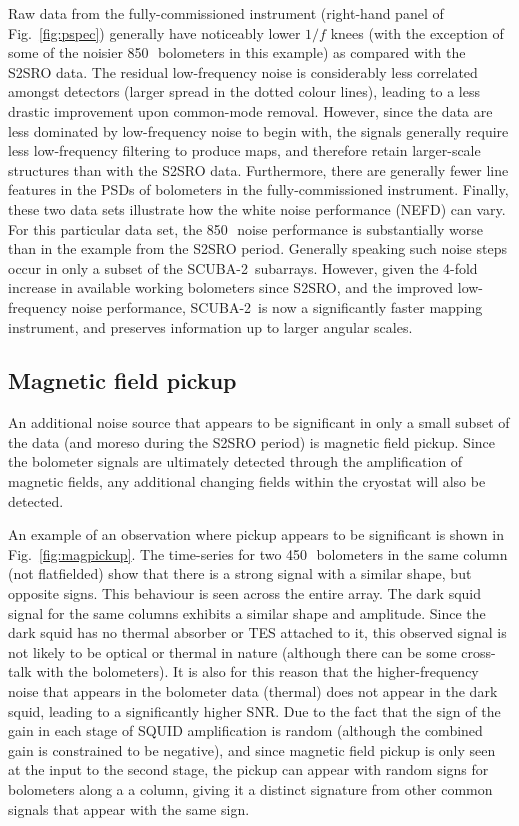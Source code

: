 \documentclass[useAMS,usenatbib,nofootinbib]{mn2e}
\newcommand{\snr}{SNR}
\newcommand{\scuba}{SCUBA-2}
\begin{document}
Raw data from the fully-commissioned instrument (right-hand panel of
Fig.~\ref{fig:pspec}) generally have noticeably lower $1/f$ knees
(with the exception of some of the noisier 850\,\micron\ bolometers in
this example) as compared with the S2SRO data. The residual
low-frequency noise is considerably less correlated amongst detectors
(larger spread in the dotted colour lines), leading to a less drastic
improvement upon common-mode removal. However, since the data are less
dominated by low-frequency noise to begin with, the signals generally
require less low-frequency filtering to produce maps, and therefore
retain larger-scale structures than with the S2SRO data. Furthermore,
there are generally fewer line features in the PSDs of bolometers in
the fully-commissioned instrument. Finally, these two data sets
illustrate how the white noise performance (NEFD) can vary. For this
particular data set, the 850\,\micron\ noise performance is
substantially worse than in the example from the S2SRO
period. Generally speaking such noise steps occur in only a subset of
the \scuba\ subarrays. However, given the 4-fold increase in available
working bolometers since S2SRO, and the improved low-frequency noise
performance, \scuba\ is now a significantly faster mapping instrument,
and preserves information up to larger angular scales.

\subsection{Magnetic field pickup}
\label{sec:magpickup}

An additional noise source that appears to be significant in only a
small subset of the data (and moreso during the S2SRO period) is
magnetic field pickup. Since the bolometer signals are ultimately
detected through the amplification of magnetic fields, any additional
changing fields within the cryostat will also be detected.

An example of an observation where pickup appears to be significant is
shown in Fig.~\ref{fig:magpickup}. The time-series for two
450\,\micron\ bolometers in the same column (not flatfielded) show
that there is a strong signal with a similar shape, but opposite
signs. This behaviour is seen across the entire array. The dark squid
signal for the same columns exhibits a similar shape and
amplitude. Since the dark squid has no thermal absorber or TES
attached to it, this observed signal is not likely to be optical or
thermal in nature (although there can be some cross-talk with the
bolometers). It is also for this reason that the higher-frequency
noise that appears in the bolometer data (thermal) does not appear in
the dark squid, leading to a significantly higher \snr. Due to the
fact that the sign of the gain in each stage of SQUID amplification is
random (although the combined gain is constrained to be negative), and
since magnetic field pickup is only seen at the input to the second
stage, the pickup can appear with random signs for bolometers along a
a column, giving it a distinct signature from other common signals
that appear with the same sign.
\end{document}
